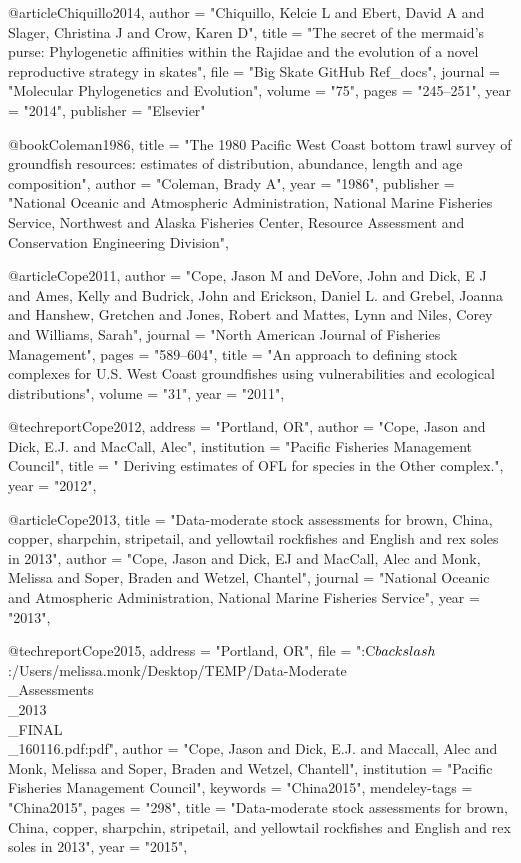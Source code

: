 @article{Chiquillo2014,
  author = "{Chiquillo, Kelcie L and Ebert, David A and Slager, Christina J and Crow, Karen D}",
  title = "{The secret of the mermaid’s purse: Phylogenetic affinities within the Rajidae and the evolution of a novel reproductive strategy in skates}",
  file = "{Big Skate GitHub Ref_docs}",
  journal = "{Molecular Phylogenetics and Evolution}",
  volume = "{75}",
  pages = "{245--251}",
  year = "{2014}",
  publisher = "{Elsevier}"
}

@book{Coleman1986,
    title = "{The 1980 Pacific West Coast bottom trawl survey of groundfish resources: estimates of distribution, abundance, length and age composition}",
    author = "{Coleman, Brady A}",
    year = "{1986}",
    publisher = "{National Oceanic and Atmospheric Administration, National Marine Fisheries Service, Northwest and Alaska Fisheries Center, Resource Assessment and Conservation Engineering Division}",
}

@article{Cope2011,
    author = "{Cope, Jason M and DeVore, John and Dick, E J and Ames, Kelly and Budrick, John and Erickson, Daniel L. and Grebel, Joanna and Hanshew, Gretchen and Jones, Robert and Mattes, Lynn and Niles, Corey and Williams, Sarah}",
    journal = "{North American Journal of Fisheries Management}",
    pages = "{589--604}",
    title = "{{An approach to defining stock complexes for U.S. West Coast groundfishes using vulnerabilities and ecological distributions}}",
    volume = "{31}",
    year = "{2011}",
}

@techreport{Cope2012,
    address = "{Portland, OR}",
    author = "{Cope, Jason and Dick, E.J. and MacCall, Alec}",
    institution = "{Pacific Fisheries Management Council}",
    title = "{{ Deriving estimates of OFL for species in the Other\nFish complex.}}",
    year = "{2012}",
}

@article{Cope2013,
    title = "{Data-moderate stock assessments for brown, China, copper, sharpchin, stripetail, and yellowtail rockfishes and English and rex soles in 2013}",
    author = "{Cope, Jason and Dick, EJ and MacCall, Alec and Monk, Melissa and Soper, Braden and Wetzel, Chantel}",
    journal = "{National Oceanic and Atmospheric Administration, National Marine Fisheries Service}",
    year = "{2013}",
}

@techreport{Cope2015,
    address = "{Portland, OR}",
    file = "{:C$\\backslash$:/Users/melissa.monk/Desktop/TEMP/Data-Moderate\\_Assessments\\_2013\\_FINAL\\_160116.pdf:pdf}",
    author = "{Cope, Jason and Dick, E.J. and Maccall, Alec and Monk, Melissa and Soper, Braden and Wetzel, Chantell}",
    institution = "{Pacific Fisheries Management Council}",
    keywords = "{China2015}",
    mendeley-tags = "{China2015}",
    pages = "{298}",
    title = "{{Data-moderate stock assessments for brown, China, copper, sharpchin, stripetail, and yellowtail rockfishes and English and rex soles in 2013}}",
    year = "{2015}",
}

